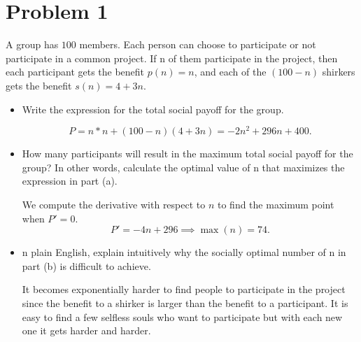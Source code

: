 \documentclass[11pt]{article}
\begin{document}
	
	
	\psetheader
\section*{Problem 1}
\begin{problem}
A group has $100$ members. Each person can choose to participate or not participate in a common project.
If n of them participate in the project, then each participant gets the benefit $p(n) = n$, and each of the
$(100 - n)$ shirkers gets the benefit $s(n) = 4 + 3n.$
\end{problem}
\begin{itemize}
    \item 
    \begin{problem}
        Write the expression for the total social payoff for the group.
    \end{problem}
    \begin{solution}
    \[P = n * n + (100-n)(4 + 3n) = -2n^2 +296n + 400.\]
    \end{solution}
    \item 
    \begin{problem}
        How many participants will result in the maximum total social payoff for the group? In other words,
calculate the optimal value of n that maximizes the expression in part (a).
    \end{problem}
    \begin{solution}
        We compute the derivative with respect to $n$ to find the maximum point when $P' = 0.$
        \[P'  = -4n +296 \implies \max(n) = 74.\]
    \end{solution}
    \item 
    \begin{problem}
        n plain English, explain intuitively why the socially optimal number of n in part (b) is difficult to
achieve.
    \end{problem}
    \begin{solution}
        It becomes exponentially harder to find people to participate in the project since the benefit to a shirker is larger than the benefit to a participant. It is easy to find a few selfless souls who want to participate but with each new one it gets harder and harder.
    \end{solution}
\end{itemize}
\newpage
\end{document}
